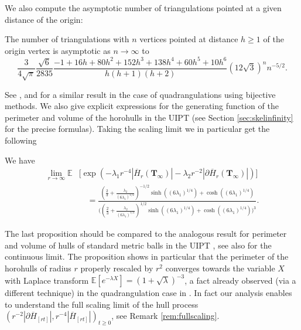 \documentclass[10pt]{amsart}
\theoremstyle{definition}\newtheorem{defi}[theo]{Definition}\newtheorem{rema}[theo]{Remark}\newtheorem{exam}[theo]{Example}\newtheorem{exem}[theo]{Example}\newtheorem{nota}[theo]{Notation}
\begin{document}
We  also compute the asymptotic number of triangulations pointed at a given distance of the origin:
\begin{proposition} \label{prop:UIPTdisth}
The number of triangulations with $n$ vertices pointed at distance $h \geq 1$ of the origin vertex is asymptotic as $n \to \infty$ to
\[ \frac{3}{4 \sqrt \pi} \frac{\sqrt{6}}{2835} \frac{-1+16h+80h^2+152h^3+138h^4+60h^5+10h^6}{h(h+1)(h+2)}
\left( 12\sqrt{3} \right)^{n} n^{-5/2}.
\]
\end{proposition}
See \cite[Equation 4.19]{BDFG03}, \cite[Equation 5.1]{BDFG} and \cite[Lemma 2.5]{CD06} for a similar result in the case of quadrangulations using bijective methods. We also give explicit expressions for the generating function of the perimeter and volume of the horohulls in the UIPT (see Section \ref{sec:skelinfinity} for the precise formulas). Taking the  scaling limit we in particular get the following



\begin{proposition} We have
\begin{align*}
\lim_{r \to \infty}
\mathbb E &\Big[
\exp \left(- \lambda_1 r^{-4}|\overline{H}_{r} (\mathbf{T}_{\infty})| - \lambda_2 r^{-2} |\partial \overline{H}_{r} (\mathbf{T}_{\infty})| \right)\Big]\\
& \quad =
\frac
{
\left(\frac{2}{3} + \frac{\lambda_2}{(6 \lambda_1)^{1/2}} \right)^{-1/2}
\sinh \left( (6 \lambda_1)^{1/4}\right) + \cosh \left( (6 \lambda_1)^{1/4}\right)
}
{\Bigg( \left(\frac{2}{3} + \frac{\lambda_2}{(6 \lambda_1)^{1/2}} \right)^{1/2}
\sinh \left( (6 \lambda_1)^{1/4}\right) + \cosh \left( (6 \lambda_1)^{1/4}\right)\Bigg)^3}.
\end{align*}
\end{proposition}

The last proposition should be compared to the analogous result for perimeter and volume of hulls of standard metric balls in the UIPT \cite{M}, see also \cite{CLG16} for the continuous limit. The proposition shows in particular that the perimeter of the horohulls of radius $r$ properly rescaled by $r^{2}$ converges towards the variable $X$ with Laplace transform $ \mathbb{E}[e^{-\lambda X}] = (1+\sqrt{\lambda})^{-3}$, a fact already observed (via a different technique) in the quadrangulation case in \cite{CMM10}. In fact our analysis enables to understand the full scaling limit of the hull process $( r^{-2}  |\partial \overline{H}_{[rt]}|, r^{-4} | \overline{H}_{[rt]}|)_{t \geq 0}$, see Remark \ref{rem:fullscaling}. \medskip
\end{document}

